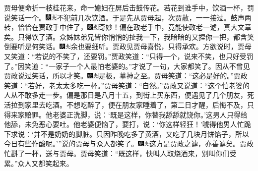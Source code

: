 贾母便命折一枝桂花来，命一媳妇在屏后击鼓传花。若花到谁手中，饮酒一杯，罚说笑话一个。{\includegraphics[width=3mm]{../Images/00004}\includegraphics[width=3mm]{../Images/00012}\footnotesize \kaishu 不犯前几次饮酒。}于是先从贾母起，次贾赦，一一接过。鼓声两转，恰恰在贾政手中住了，{\includegraphics[width=3mm]{../Images/00004}\includegraphics[width=3mm]{../Images/00012}\footnotesize \kaishu 奇妙！偏在政老手中，竟能使政老一谑，真大文章矣。}只得饮了酒。众姊妹弟兄皆你悄悄的扯我一下，我暗暗的又捏你一把，都含笑倒要听是何笑话。{\includegraphics[width=3mm]{../Images/00004}\includegraphics[width=3mm]{../Images/00012}\footnotesize \kaishu 余也要细听。}贾政见贾母喜悦，只得承欢。方欲说时，贾母又笑道：“若说的不笑了，还要罚。”贾政笑道：“只得一个，说来不笑，也只好受罚了。”因笑道：“一家子一个人最怕老婆的。”才说了一句，大家都笑了。因从不曾见贾政说过笑话，所以才笑。{\includegraphics[width=3mm]{../Images/00004}\includegraphics[width=3mm]{../Images/00012}\footnotesize \kaishu 是极，摹神之至。}贾母笑道：“这必是好的。”贾政笑道：“若好，老太太多吃一杯。”贾母笑道：“自然。”贾政又说道：“这个怕老婆的人从不敢多走一步。偏是那日是八月十五，到街上买东西，便遇见了几个朋友，死活拉到家里去吃酒。不想吃醉了，便在朋友家睡着了，第二日才醒，后悔不及，只得来家赔罪。他老婆正洗脚，说：‘既是这样，你替我舔舔就饶你。’这男人只得给他舔，未免恶心要吐。他老婆便恼了，要打，说：‘你这样轻狂！’唬得他男人忙跪下求说：‘并不是奶奶的脚脏。只因昨晚吃多了黄酒，又吃了几块月饼馅子，所以今日有些作酸呢。’”说的贾母与众人都笑了。{\includegraphics[width=3mm]{../Images/00004}\includegraphics[width=3mm]{../Images/00012}\footnotesize \kaishu 这方是贾政之谑，亦善谑矣。}贾政忙斟了一杯，送与贾母。贾母笑道：“既这样，快叫人取烧酒来，别叫你们受累。”众人又都笑起来。

